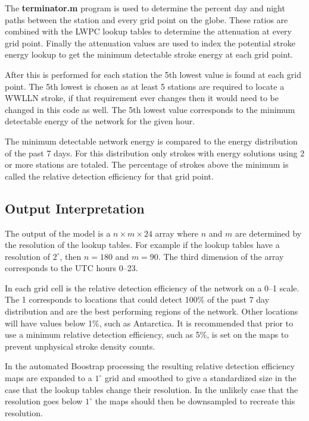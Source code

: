 The {\bf terminator.m} program is used to determine the percent day and night paths between the station and every grid point on the globe.
These ratios are combined with the LWPC lookup tables to determine the attenuation at every grid point.
Finally the attenuation values are used to index the potential stroke energy lookup to get the minimum detectable stroke energy at each grid point.

After this is performed for each station the 5th lowest value is found at each grid point.
The 5th lowest is chosen as at least 5 stations are required to locate a WWLLN stroke, if that requirement ever changes then it would need to be changed in this code as well.
The 5th lowest value corresponds to the minimum detectable energy of the network for the given hour.

The minimum detectable network energy is compared to the energy distribution of the past 7 days.
For this distribution only strokes with energy solutions using 2 or more stations are totaled.
The percentage of strokes above the minimum is called the relative detection efficiency for that grid point.

\subsection{Output Interpretation}

The output of the model is a $n\times m \times 24$ array where $n$ and $m$ are determined by the resolution of the lookup tables.
For example if the lookup tables have a resolution of $2^\circ$, then $n=180$ and $m=90$.
The third dimension of the array corresponds to the UTC hours 0--23.

In each grid cell is the relative detection efficiency of the network on a 0--1 scale.
The 1 corresponds to locations that could detect 100\% of the past 7 day distribution and are the best performing regions of the network.
Other locations will have values below 1\%, such as Antarctica.
It is recommended that prior to use a minimum relative detection efficiency, such as 5\%, is set on the maps to prevent unphysical stroke density counts.

In the automated Boostrap processing the resulting relative detection efficiency maps are expanded to a $1^\circ$ grid and smoothed to give a standardized size in the case that the lookup tables change their resolution.
In the unlikely case that the resolution goes below $1^\circ$ the maps should then be downsampled to recreate this resolution.